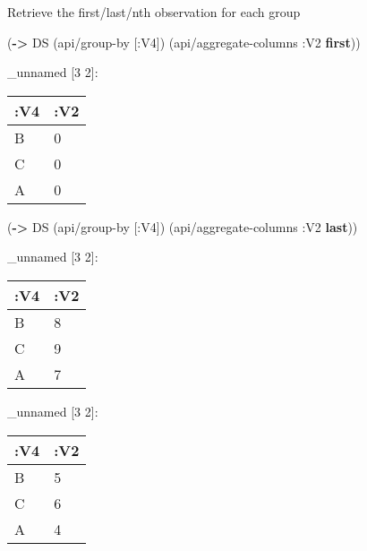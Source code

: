 \documentclass[]{article}
\newenvironment{Shaded}{\begin{snugshade}}{\end{snugshade}}
\newcommand{\KeywordTok}[1]{\textcolor[rgb]{0.13,0.29,0.53}{\textbf{#1}}}
\newcommand{\DecValTok}[1]{\textcolor[rgb]{0.00,0.00,0.81}{#1}}
\newcommand{\VariableTok}[1]{\textcolor[rgb]{0.00,0.00,0.00}{#1}}
\newcommand{\AttributeTok}[1]{\textcolor[rgb]{0.77,0.63,0.00}{#1}}
\newcommand{\NormalTok}[1]{#1}
\begin{document}
Retrieve the first/last/nth observation for each group

\begin{Shaded}
\begin{Highlighting}[]
\NormalTok{(}\KeywordTok{->}\NormalTok{ DS}
\NormalTok{    (api/group-by [}\AttributeTok{:V4}\NormalTok{])}
\NormalTok{    (api/aggregate-columns }\AttributeTok{:V2} \KeywordTok{first}\NormalTok{))}
\end{Highlighting}
\end{Shaded}

\_unnamed {[}3 2{]}:

\begin{longtable}[]{@{}ll@{}}
\toprule
:V4 & :V2\tabularnewline
\midrule
\endhead
B & 0\tabularnewline
C & 0\tabularnewline
A & 0\tabularnewline
\bottomrule
\end{longtable}

\begin{Shaded}
\begin{Highlighting}[]
\NormalTok{(}\KeywordTok{->}\NormalTok{ DS}
\NormalTok{    (api/group-by [}\AttributeTok{:V4}\NormalTok{])}
\NormalTok{    (api/aggregate-columns }\AttributeTok{:V2} \KeywordTok{last}\NormalTok{))}
\end{Highlighting}
\end{Shaded}

\_unnamed {[}3 2{]}:

\begin{longtable}[]{@{}ll@{}}
\toprule
:V4 & :V2\tabularnewline
\midrule
\endhead
B & 8\tabularnewline
C & 9\tabularnewline
A & 7\tabularnewline
\bottomrule
\end{longtable}

\begin{Shaded}
\end{Shaded}

\_unnamed {[}3 2{]}:

\begin{longtable}[]{@{}ll@{}}
\toprule
:V4 & :V2\tabularnewline
\midrule
\endhead
B & 5\tabularnewline
C & 6\tabularnewline
A & 4\tabularnewline
\bottomrule
\end{longtable}
\end{document}
